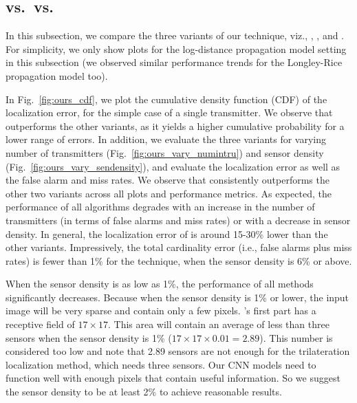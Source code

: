 \subsection{\bf \our vs.\ \ouryolo vs.\ \ourpeak}

In this subsection, we compare the three variants of our technique, viz., \our, \ouryolo, and
\ourpeak. For simplicity, we only show plots for the log-distance propagation model setting in this 
subsection (we observed similar performance trends for the Longley-Rice propagation model too). 

In Fig.~\ref{fig:ours_cdf}, we plot  the cumulative density function (CDF) of the localization
error, for the simple case of a single transmitter.
We observe that \our outperforms the other variants, as it yields a higher cumulative probability for a lower range of errors.
In addition, we evaluate the three variants for varying number of transmitters (Fig.~\ref{fig:ours_vary_numintru}) and sensor density (Fig.~\ref{fig:ours_vary_sendensity}), and evaluate the localization error as well as the false alarm and miss rates. 
We observe that \our consistently outperforms the other two variants 
across all plots and performance metrics. As expected, the performance of all algorithms 
degrades with an increase in the number of transmitters (in terms of false alarms and miss rates) or with a decrease in sensor density. 
In general, the localization error of \our is around 15-30\% lower than the other variants.
Impressively, the total cardinality error (i.e., false alarms plus miss rates) is fewer than 1\% for the \our technique, when the sensor density is 6\% or above.

When the sensor density is as low as 1\%, the performance of all methods significantly decreases.
Because when the sensor density is 1\% or lower, the input image will be very sparse and contain only a few pixels.
\our's first part \imgimg has a receptive field of $17\times17$.
This area will contain an average of less than three sensors when the sensor density is 1\% ($17\times17\times0.01=2.89$).
This number is considered too low and note that 2.89 sensors are not enough for the trilateration localization method, which needs three sensors.
Our CNN models need to function well with enough pixels that contain useful information. 
So we suggest the sensor density to be at least 2\% to achieve reasonable results.

